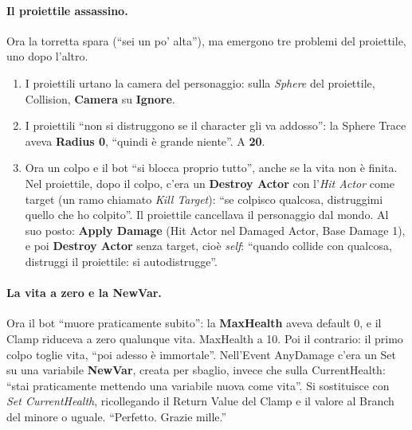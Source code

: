 \paragraph{Il proiettile assassino.} Ora la torretta spara (``sei un po' alta''), ma
emergono tre problemi del proiettile, uno dopo l'altro.
\begin{enumerate}
  \item I proiettili urtano la camera del personaggio: sulla \emph{Sphere} del proiettile,
        Collision, \textbf{Camera} su \textbf{Ignore}.
  \item I proiettili ``non si distruggono se il character gli va addosso'': la Sphere
        Trace aveva \textbf{Radius 0}, ``quindi è grande niente''. A \textbf{20}.
  \item Ora un colpo e il bot ``si blocca proprio tutto'', anche se la vita non è finita.
        Nel proiettile, dopo il colpo, c'era un \textbf{Destroy Actor} con l'\emph{Hit
        Actor} come target (un ramo chiamato \emph{Kill Target}): ``se colpisco qualcosa,
        distruggimi quello che ho colpito''. Il proiettile cancellava il personaggio dal
        mondo. Al suo posto: \textbf{Apply Damage} (Hit Actor nel Damaged Actor, Base
        Damage 1), e poi \textbf{Destroy Actor} senza target, cioè \emph{self}: ``quando
        collide con qualcosa, distruggi il proiettile: si autodistrugge''.
\end{enumerate}

\paragraph{La vita a zero e la NewVar.} Ora il bot ``muore praticamente subito'': la
\textbf{MaxHealth} aveva default 0, e il Clamp riduceva a zero qualunque vita. MaxHealth a
10. Poi il contrario: il primo colpo toglie vita, ``poi adesso è immortale''. Nell'Event
AnyDamage c'era un Set su una variabile \textbf{NewVar}, creata per sbaglio, invece che
sulla CurrentHealth: ``stai praticamente mettendo una variabile nuova come vita''. Si
sostituisce con \emph{Set CurrentHealth}, ricollegando il Return Value del Clamp e il
valore al Branch del minore o uguale. ``Perfetto. Grazie mille.''

